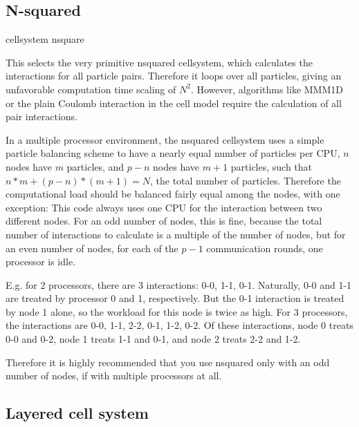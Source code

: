 \subsection{N-squared}

\begin{pysyntax}
\end{pysyntax}


\begin{essyntax}
  cellsystem nsquare 
\end{essyntax}
This selects the very primitive nsquared cellsystem, which calculates
the interactions for all particle pairs. Therefore it loops over all
particles, giving an unfavorable computation time scaling of $N^2$.
However, algorithms like MMM1D or the plain Coulomb interaction in the
cell model require the calculation of all pair interactions.

In a multiple processor environment, the nsquared cellsystem uses a
simple particle balancing scheme to have a nearly equal number of
particles per CPU, \ie $n$ nodes have $m$ particles, and $p-n$ nodes
have $m+1$ particles, such that $n*m+(p-n)*(m+1)=N$, the total number
of particles. Therefore the computational load should be balanced
fairly equal among the nodes, with one exception: This code always
uses one CPU for the interaction between two different nodes. For an
odd number of nodes, this is fine, because the total number of
interactions to calculate is a multiple of the number of nodes, but
for an even number of nodes, for each of the $p-1$ communication
rounds, one processor is idle.

E.g. for 2 processors, there are 3 interactions: 0-0, 1-1, 0-1.
Naturally, 0-0 and 1-1 are treated by processor 0 and 1, respectively.
But the 0-1 interaction is treated by node 1 alone, so the workload
for this node is twice as high. For 3 processors, the interactions are
0-0, 1-1, 2-2, 0-1, 1-2, 0-2. Of these interactions, node 0 treats 0-0
and 0-2, node 1 treats 1-1 and 0-1, and node 2 treats 2-2 and 1-2.

Therefore it is highly recommended that you use nsquared only with an
odd number of nodes, if with multiple processors at all. 

\subsection{Layered cell system}

\begin{pysyntax}
\end{pysyntax}


